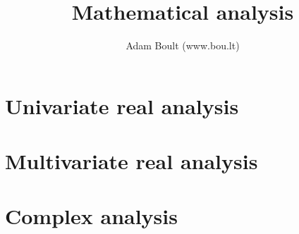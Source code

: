 \documentclass[oneside]{book}
\begin{document}
\author{Adam Boult (www.bou.lt)}
\title{Mathematical analysis}
\maketitle

\setcounter{tocdepth}{0}
\tableofcontents



\part{Univariate real analysis}

















\part{Multivariate real analysis}








\part{Complex analysis}




\end{document}
